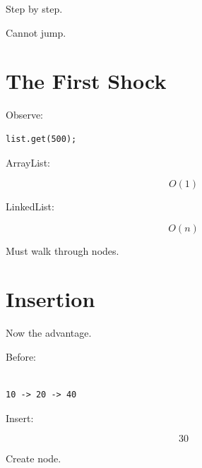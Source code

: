 \documentclass[11pt,a4paper]{book}
\begin{document}

Step by step.


Cannot jump.


\section{The First Shock}

Observe:

\begin{verbatim} 
list.get(500);
\end{verbatim}


ArrayList:

\[
O(1)
\]


LinkedList:

\[
O(n)
\]


Must walk through nodes.


\section{Insertion}

Now the advantage.


Before:

\begin{verbatim}

10 -> 20 -> 40

\end{verbatim}


Insert:

\[
30
\]


Create node.

\end{document}

